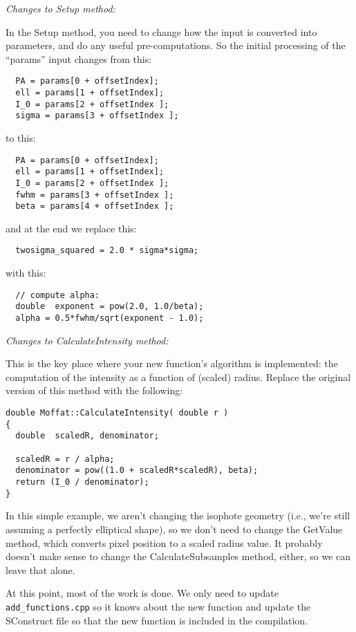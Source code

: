 \documentclass[10pt]{article}
\begin{document}
\bigskip
\noindent \textit{Changes to Setup method:}
\smallskip

In the Setup method, you need to change how the input is converted into
parameters, and do any useful pre-computations. So the initial processing of
the ``params'' input changes from this:
\begin{verbatim}
  PA = params[0 + offsetIndex];
  ell = params[1 + offsetIndex];
  I_0 = params[2 + offsetIndex ];
  sigma = params[3 + offsetIndex ];
\end{verbatim}

to this:
\begin{verbatim}
  PA = params[0 + offsetIndex];
  ell = params[1 + offsetIndex];
  I_0 = params[2 + offsetIndex ];
  fwhm = params[3 + offsetIndex ];
  beta = params[4 + offsetIndex ];
\end{verbatim}
and at the end we replace this:
\begin{verbatim}
  twosigma_squared = 2.0 * sigma*sigma;
\end{verbatim}
with this:
\begin{verbatim}
  // compute alpha:
  double  exponent = pow(2.0, 1.0/beta);
  alpha = 0.5*fwhm/sqrt(exponent - 1.0);
\end{verbatim}


\bigskip
\noindent \textit{Changes to CalculateIntensity method:}
\smallskip

This is the key place where your new function's algorithm is
implemented: the computation of the intensity as a function of (scaled)
radius.  Replace the original version of this method with the following:
\begin{verbatim}
double Moffat::CalculateIntensity( double r )
{
  double  scaledR, denominator;
  
  scaledR = r / alpha;
  denominator = pow((1.0 + scaledR*scaledR), beta);
  return (I_0 / denominator);
}
\end{verbatim}

\bigskip

In this simple example, we aren't changing the isophote geometry (i.e.,
we're still assuming a perfectly elliptical shape), so we don't need to
change the GetValue method, which converts pixel position to a scaled
radius value.  It probably doesn't make sense to change the
CalculateSubsamples method, either, so we can leave that alone.

At this point, most of the work is done.  We only need to update
\texttt{add\_functions.cpp} so it knows about the new function and
update the SConstruct file so that the new function is included in the
compilation.
\end{document}
